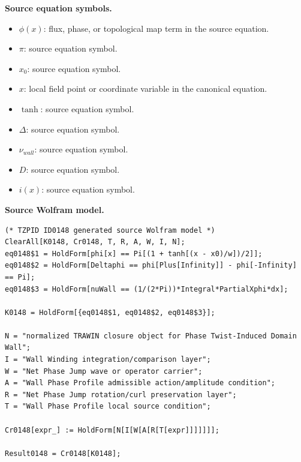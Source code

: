 \begin{minipage}[t]{0.49\linewidth}
\begingroup
\small
\raggedright
\textbf{Source equation symbols.}\par
\begin{itemize}[leftmargin=1.35em,itemsep=1pt,topsep=1pt,parsep=0pt]
    \item $\phi(x)$: flux, phase, or topological map term in the source equation.
    \item $\pi$: source equation symbol.
    \item $x_0$: source equation symbol.
    \item $x$: local field point or coordinate variable in the canonical equation.
    \item $\tanh$: source equation symbol.
    \item $\Delta$: source equation symbol.
    \item $\nu_{wall}$: source equation symbol.
    \item $D$: source equation symbol.
    \item $i(x)$: source equation symbol.
\end{itemize}
\endgroup
\end{minipage}\hfill
\begin{minipage}[t]{0.47\linewidth}
\begingroup
\scriptsize
\raggedright
\textbf{Source Wolfram model.}\par
\begin{Verbatim}[fontsize=\tiny,breaklines=true,breakanywhere=true]
(* TZPID ID0148 generated source Wolfram model *)
ClearAll[K0148, Cr0148, T, R, A, W, I, N];
eq0148$1 = HoldForm[phi[x] == Pi[(1 + tanh[(x - x0)/w])/2]];
eq0148$2 = HoldForm[Deltaphi == phi[Plus[Infinity]] - phi[-Infinity] == Pi];
eq0148$3 = HoldForm[nuWall == (1/(2*Pi))*Integral*PartialXphi*dx];

K0148 = HoldForm[{eq0148$1, eq0148$2, eq0148$3}];

N = "normalized TRAWIN closure object for Phase Twist-Induced Domain Wall";
I = "Wall Winding integration/comparison layer";
W = "Net Phase Jump wave or operator carrier";
A = "Wall Phase Profile admissible action/amplitude condition";
R = "Net Phase Jump rotation/curl preservation layer";
T = "Wall Phase Profile local source condition";

Cr0148[expr_] := HoldForm[N[I[W[A[R[T[expr]]]]]]];

Result0148 = Cr0148[K0148];
\end{Verbatim}
\endgroup
\end{minipage}

